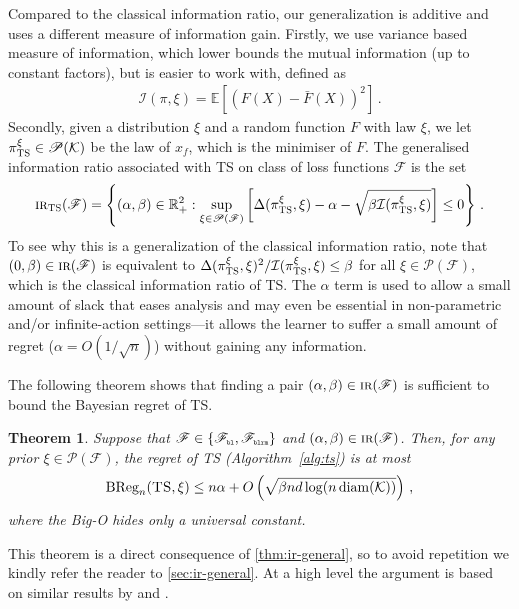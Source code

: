 \documentclass[letter, 12pt]{report}
\newcommand{\pr}{\text{\tiny\texttt{r}}}
\newcommand{\pb}{\text{\tiny\texttt{b}}}
\newcommand{\pl}{\text{\tiny\texttt{l}}}
\renewcommand{\pm}{\text{\tiny\texttt{m}}}
\newcommand{\R}{\mathbb R}
\newcommand{\BReg}{\textrm{BReg}}
\newcommand{\E}{\mathbb E}
\newcommand{\cK}{\mathcal K}
\newcommand{\sF}{\mathscr F}
\newcommand{\sP}{\mathscr P}
\newcommand{\diam}{\operatorname{diam}}
\newcommand{\I}{\mathcal{I}}
\newcommand{\1}{\mathbf{1}}
\newcommand{\IR}{\operatorname{\textsc{ir}}}
\newcommand{\ts}{\textsc{TS}\xspace}
\theoremstyle{plain}
\newtheorem{theorem}{Theorem}
\theoremstyle{definition}
\theoremstyle{remark}
\begin{document}
Compared to the classical information ratio, our generalization is additive and uses a different measure of information gain.
Firstly, we use variance based measure of information, which lower bounds the mutual information (up to constant factors), but is easier to work with, defined as
\begin{align*}
    \I(\pi, \xi) = \E\left[(F(X) - \bar F(X))^2\right]\,.
\end{align*}
Secondly, given a distribution $\xi$ and a random function $F$ with law $\xi$, we let $\pi^\xi_\ts \in \sP(\cK)$ be the law of $x_f$, which is the minimiser of $F$.
The generalised information ratio associated with \ts on class of loss functions $\sF$ is the set
\begin{align*}
    \IR_\ts(\sF) = \left\{(\alpha, \beta) \in \R_+^2 : \sup_{\xi \in \sP(\sF)} \left[\Delta(\pi^\xi_\ts, \xi) - \alpha - \sqrt{\beta \I(\pi^\xi_\ts, \xi)}\right] \leq 0 \right\} \,.
\end{align*}
To see why this is a generalization of the classical information ratio, note
that $(0, \beta) \in \IR(\sF)$ is equivalent to $\Delta(\pi_\ts^\xi, \xi)^2 / \I(\pi_\ts^\xi, \xi) \leq \beta$ for all $\xi \in \sP(\sF)$, which is the classical information ratio of \ts{}.
The $\alpha$ term is used to allow a small amount of slack that eases analysis and may even be essential in non-parametric and/or infinite-action settings---it allows the learner to suffer a small amount of regret ($\alpha = O(1/\sqrt{n})$) without gaining any information.

The following theorem shows that finding a pair $(\alpha, \beta) \in \IR(\sF)$ is sufficient to bound the Bayesian regret of \ts{}.
\begin{theorem}\label{thm:ts-ir-regret}
    Suppose that $\sF \in \{\sF_{\pb\pl}, \sF_{\pb\pl\pr\pm}\}$ and $(\alpha, \beta) \in \IR(\sF)$.
    Then, for any prior $\xi \in \sP(\sF)$, the regret of \ts{} (Algorithm~\ref{alg:ts}) is at most
    \begin{align*}
        \BReg_n(\ts, \xi) \leq n \alpha + O\left(\sqrt{\beta n d \log(n \diam(\cK))}\right) \,,
    \end{align*}
    where the Big-O hides only a universal constant.
\end{theorem}
This theorem is a direct consequence of \cref{thm:ir-general}, so to avoid repetition we kindly refer the reader to \cref{sec:ir-general}.
At a high level the argument is based on similar results by \cite{BDKP15} and \cite{BE18}.
\end{document}
